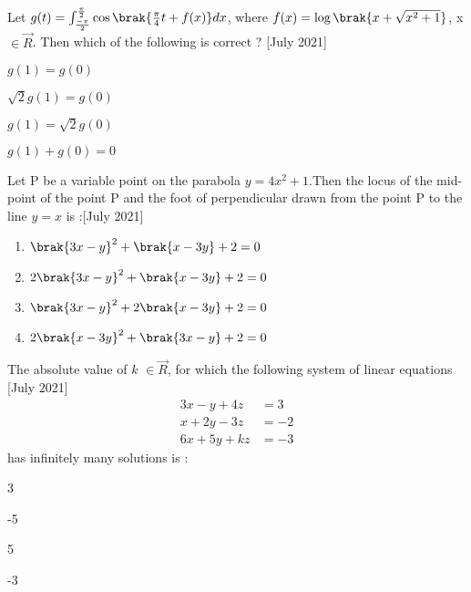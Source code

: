 \iffalse
\title{2021}
\author{EE24BTECH11012}
\section{mcq-single}
\fi
	 	
	\item Let $ g(t) = \int_{\frac{- \pi}{2}}^{\frac{\pi}{2}} \cos{\brak{\frac{\pi}{4}t + f(x)}} dx$, where $f(x) = \log{\brak{x + \sqrt{x^2 + 1}}}$, x $\in \vec{R}$. Then which of the following is correct ? \hfill{[July 2021]}
	 \begin{enumerate}
	 \end{enumerate}
 \item Let P be a variable point on the parabola $y=4x^2+1$.Then the locus of the mid-point of the point P and the foot of perpendicular drawn from the point P to the line $y=x$ is :\hfill{[July 2021]}
	 \begin{enumerate}
		 \item $\brak{3x-y}^2 + \brak{x-3y} + 2 = 0$
		 \item $2 \brak{3x-y}^2 + \brak{x-3y} + 2 = 0$
		 \item $\brak{3x-y}^2 + 2\brak{x-3y} + 2 = 0$
		 \item $2 \brak{x-3y}^2 + \brak{3x-y} + 2 = 0$
	 \end{enumerate}
\item The absolute value of $k$ $ \in \vec{R}$, for which the following system of linear equations \hfill{[July 2021]}
		\begin{align}
			3x - y + 4z &= 3 \\ 
			x + 2y - 3z &= -2 \\
			6x + 5y + kz &= -3 
		\end{align}
		has infinitely many solutions is :
	\begin{enumerate}
			\begin{multicols}{4}
			\item 3
			\item -5
			\item 5
			\item -3
			\end{multicols}
	\end{enumerate}
